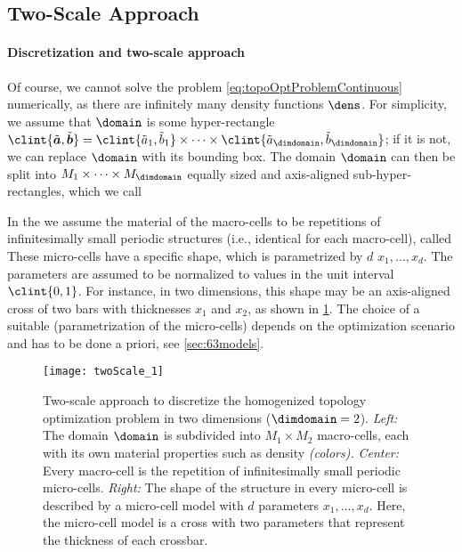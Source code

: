 \subsection{Two-Scale Approach}
\label{sec:612twoScale}

\paragraph{Discretization and two-scale approach}

Of course, we cannot solve the problem \eqref{eq:topoOptProblemContinuous}
numerically,
as there are infinitely many density functions $\dens$.
For simplicity, we assume that $\domain$ is some hyper-rectangle
$\clint{\tilde{\*a}, \tilde{\*b}}
= \clint{\tilde{a}_1, \tilde{b}_1} \times \dotsb \times
\clint{\tilde{a}_{\dimdomain}, \tilde{b}_{\dimdomain}}$;
if it is not, we can replace $\domain$ with its bounding box.
The domain $\domain$ can then be split into
$M_1 \times \dotsb \times M_{\dimdomain}$
equally sized and axis-aligned sub-hyper-rectangles,
which we call 

In the 
we assume the material of the macro-cells to be
repetitions of infinitesimally small periodic structures
(i.e., identical for each macro-cell),
called 
These micro-cells have a specific shape, which is parametrized by
$d$  $x_1, \dotsc, x_d$.
The parameters are assumed to be normalized to values in the
unit interval $\clint{0, 1}$.
For instance, in two dimensions,
this shape may be an axis-aligned cross of two bars
with thicknesses $x_1$ and $x_2$, as shown in \cref{fig:twoScale}.
The choice of a suitable 
(parametrization of the micro-cells)
depends on the optimization scenario and has to be done a priori,
see \cref{sec:63models}.

\begin{figure}
  \texttt{[image: twoScale\_1]}%
  \caption[%
    Two-scale approach for topology optimization%
  ]{%
    Two-scale approach to discretize the homogenized topology
    optimization problem in two dimensions ($\dimdomain = 2$).
    \emph{Left:} The domain $\domain$ is subdivided into $M_1 \times M_2$
    macro-cells, each with its own material properties such as density
    \emph{(colors).}
    \emph{Center:} Every macro-cell is the repetition of infinitesimally small
    periodic micro-cells.
    \emph{Right:} The shape of the structure in every micro-cell is
    described by a micro-cell model with $d$ parameters $x_1, \dotsc, x_d$.
    Here, the micro-cell model is a cross with two parameters
    that represent the thickness of each crossbar.%
  }%
  \label{fig:twoScale}%
\end{figure}

